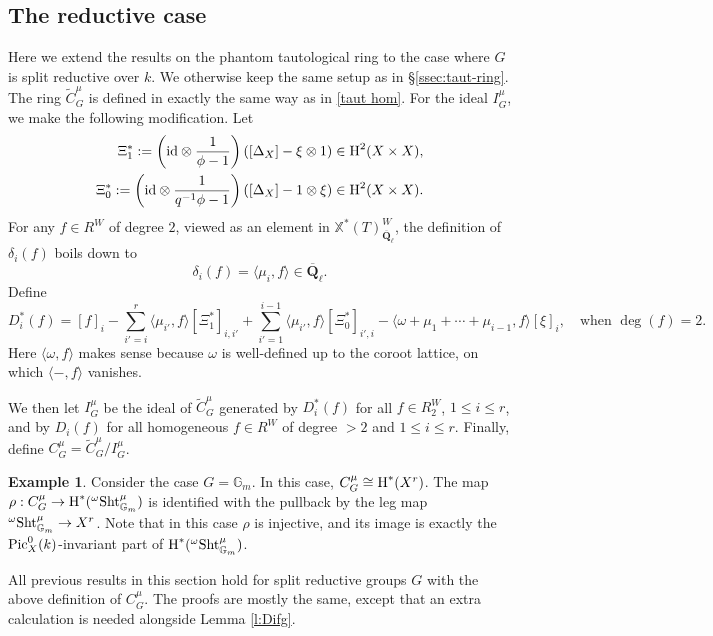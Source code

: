 \documentclass[reqno]{amsart}
\numberwithin{equation}{subsection}
\theoremstyle{definition}
\newtheorem{exam}[subsubsection]{Example}
\def\GG{\mathbb{G}}
\newcommand\id{\textup{id}}
\newcommand{\Pic}{\textup{Pic}}
\newcommand\Sht{\textup{Sht}}
\newcommand{\Gm}{\GG_m}
\newcommand\xch{\mathbb{X}^*}
\newcommand{\Qlbar}{\overline{\Q}_\ell}
\renewcommand{\j}[1]{\langle{#1}\rangle}
\newcommand{\wt}[1]{\widetilde{#1}}
\newcommand\ot{\otimes}
\newcommand{\cohog}[2]{\textup{H}^{#1}({#2})}     %
\renewcommand\d\delta
\newcommand\D\Delta
\renewcommand\r\rho
\newcommand{\om}{\omega}
\newcommand{\Q}{\mathbf{Q}}
\begin{document}
\subsection{The reductive case}\label{ssec:phantom-reductive} Here we extend the results on the phantom tautological ring to the case where $G$ is split reductive over $k$. We otherwise keep the same setup as in \S\ref{ssec:taut-ring}. The ring $\wt C^\mu_G$ is defined in exactly the same way as in \eqref{taut hom}. For the ideal $I^\mu_G$, we make the following modification. Let
\begin{eqnarray*}
    \Xi^*_1:=\left(\id\ot \frac{1}{\phi-1}\right)([\D_X]-\xi\ot 1)\in \cohog{2}{X\times X},\\
    \Xi^*_0:=\left(\id\ot \frac{1}{q^{-1}\phi-1}\right)([\D_X]-1\ot \xi)\in \cohog{2}{X\times X}.
\end{eqnarray*}
For any $f\in R^W$ of degree $2$, viewed as an element in $\xch(T)^W_{\Qlbar}$, the definition of $\d_i(f)$ boils down to
\begin{equation*}
    \d_i(f)=\j{\mu_i,f}\in \Qlbar.
\end{equation*}
Define
\begin{equation*}
    D^*_i(f)=[f]_i-\sum_{i'= i}^r\j{\mu_{i'},f}[\Xi^*_1]_{i,i'}+\sum_{i'=1}^{i-1}\j{\mu_{i'},f}[\Xi^*_{0}]_{i',i}-\j{\om+\mu_1+\cdots+\mu_{i-1},f}[\xi]_i, \quad \mbox{when }\deg(f)=2.
\end{equation*}
Here $\j{\om, f}$ makes sense because $\om$ is well-defined up to the coroot lattice, on which $\j{-,f}$ vanishes.

We then let $I^\mu_G$ be the ideal of $\wt  C^\mu_G$ generated by $D^*_i(f)$ for all $f\in R^W_2$, $1\le i\le r$, and by $D_i(f)$ for all homogeneous $f\in R^W$ of degree $>2$ and $1\le i\le r$. Finally, define $C^\mu_G=\wt C^\mu_G/I^\mu_G$.

\begin{exam}
    Consider the case $G=\Gm$. In this case, $C^\mu_G\cong \cohog{*}{X^r}$. The map $\rho: C^\mu_G\to \cohog{*}{{}^{\om}\Sht^\mu_{\Gm}}$ is identified with the pullback by the leg map ${}^{\om}\Sht^\mu_{\Gm}\to X^r$. Note that in this case $\r$ is injective, and its image is exactly the $\Pic^0_X(k)$-invariant part of $\cohog{*}{{}^{\om}\Sht^\mu_{\Gm}}$.
\end{exam}

All previous results in this section hold for split reductive groups $G$ with the above definition of $C^\mu_G$. The proofs are mostly the same, except that an extra calculation is needed alongside Lemma \ref{l:Difg}.
\end{document}

